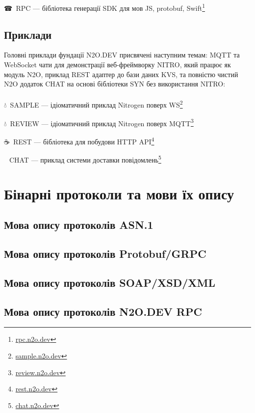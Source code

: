 \setmainfont{Segoe UI Emoji}☎\setmainfont{Geometria}\ RPC --- бібліотека генерації SDK для мов JS, protobuf, Swift\footnote{\url{rpc.n2o.dev}}

\subsection{Приклади}

Головні приклади фундації N2O.DEV присвячені наступним темам: MQTT та WebSocket
чати для демонстрації веб-фреймворку NITRO, який працює як модуль N2O, приклад
REST адаптер до бази даних KVS, та повністю чистий N2O додаток CHAT на основі
бібліотеки SYN без використання NITRO:\\
\\ \indent
\setmainfont{Segoe UI Emoji}💧\setmainfont{Geometria}\ SAMPLE --- ідіоматичний приклад Nitrogen поверх WS\footnote{\url{sample.n2o.dev}}

\setmainfont{Segoe UI Emoji}💧\setmainfont{Geometria}\ REVIEW --- ідіоматичний приклад Nitrogen поверх MQTT\footnote{\url{review.n2o.dev}}

\setmainfont{Segoe UI Emoji}☕\setmainfont{Geometria}\ REST --- бібліотека для побудови HTTP API\footnote{\url{rest.n2o.dev}}

\setmainfont{Segoe UI Emoji}💬\setmainfont{Geometria}\ CHAT --- приклад системи доставки повідомлень\footnote{\url{chat.n2o.dev}}

\newpage
\section{Бінарні протоколи та мови їх опису}

\subsection{Мова опису протоколів ASN.1}

\subsection{Мова опису протоколів Protobuf/GRPC}

\subsection{Мова опису протоколів SOAP/XSD/XML}

\subsection{Мова опису протоколів N2O.DEV RPC}

